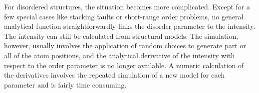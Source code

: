 For disordered structures, the situation becomes more complicated.
Except for a few special cases like stacking faults or short-range
order problems, no general analytical function straightforwardly 
links the disorder parameter to the intensity. The intensity 
can still be calculated from structural models. The simulation,
however, usually involves the application of random choices 
to generate part or all of the atom positions, and the analytical
derivative of the intensity with respect to the order parameter
is no longer available. A numeric calculation of the derivatives
involves the repeated simulation of a new model for each parameter
and is fairly time consuming.

